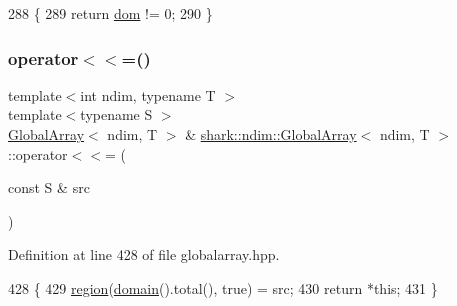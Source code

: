 \begin{DoxyCode}
288                                                         \{
289             \textcolor{keywordflow}{return} \hyperlink{classshark_1_1ndim_1_1_global_array_a412e192f4c7a15888da625ae833e8d3e}{dom} != 0;
290         \}
\end{DoxyCode}
\hypertarget{classshark_1_1ndim_1_1_global_array_ab76900c34fa648d9a953fbfb55c5131e}{}\label{classshark_1_1ndim_1_1_global_array_ab76900c34fa648d9a953fbfb55c5131e} 
\subsubsection{\texorpdfstring{operator$<$$<$=()}{operator<<=()}}
{\footnotesize\ttfamily template$<$int ndim, typename T $>$ \\
template$<$typename S $>$ \\
\hyperlink{classshark_1_1ndim_1_1_global_array}{Global\+Array}$<$ ndim, T $>$ \& \hyperlink{classshark_1_1ndim_1_1_global_array}{shark\+::ndim\+::\+Global\+Array}$<$ ndim, T $>$\+::operator$<$$<$= (\begin{DoxyParamCaption}\item[{const S \&}]{src }\end{DoxyParamCaption})}



Definition at line 428 of file globalarray.\+hpp.


\begin{DoxyCode}
428                                                                           \{
429             \hyperlink{classshark_1_1ndim_1_1_global_array_a40939e7384b55a49b59c63dc717224d2}{region}(\hyperlink{classshark_1_1ndim_1_1_global_array_a435ee8ff23c3feadf2ef2be64d4f375c}{domain}().total(), \textcolor{keyword}{true}) = src;
430             \textcolor{keywordflow}{return} *\textcolor{keyword}{this};
431         \}
\end{DoxyCode}
\hypertarget{classshark_1_1ndim_1_1_global_array_a65fd825eff8e4b3d49f1111e487991f3}{}\label{classshark_1_1ndim_1_1_global_array_a65fd825eff8e4b3d49f1111e487991f3} 
